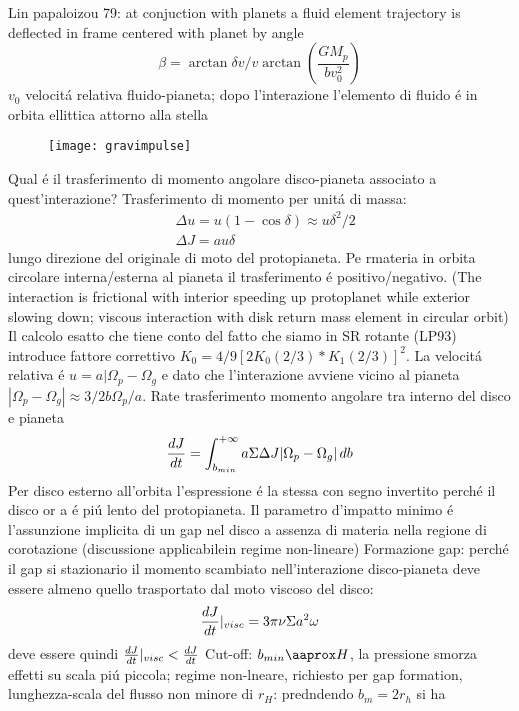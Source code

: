 \begin{workout}
Lin papaloizou 79: at conjuction with planets a fluid element trajectory is deflected in frame centered with planet by angle
\begin{equation}
\beta=\arctan{\delta v/v}\arctan{(\frac{GM_p}{bv_0^2})}
\end{equation}
$v_0$ velocit\'a relativa fluido-pianeta; dopo l'interazione l'elemento di fluido \'e in orbita ellittica attorno alla stella
\begin{figure}[!t]
\texttt{[image: gravimpulse]}
\end{figure}
Qual \'e il trasferimento di momento angolare disco-pianeta associato a quest'interazione?
Trasferimento di momento per unit\'a di massa:
\begin{align}
&\Delta u=u(1-\cos{\delta})\approx u\delta^2/2\\
&\Delta J=au\delta
\end{align}
lungo direzione del originale di moto del protopianeta.
Pe rmateria in orbita circolare interna/esterna al pianeta il trasferimento \'e positivo/negativo.
(The interaction is frictional with interior speeding up protoplanet while exterior slowing down; viscous interaction with disk return mass element in circular orbit)
Il calcolo esatto che tiene conto del fatto che siamo in SR rotante (LP93) introduce fattore correttivo $K_0=4/9[2K_0(2/3)*K_1(2/3)]^2$.
La velocit\'a relativa \'e $u=a|\Omega_p-\Omega_g$ e dato che l'interazione avviene vicino al pianeta $|\Omega_p-\Omega_g|\approx3/2b\Omega_p/a$.
Rate trasferimento momento angolare tra interno del disco e pianeta
\begin{equation}
\TDy{t}{J}=\int_{b_{min}}^{+\infty}a\Sigma\Delta J|\Omega_p-\Omega_g|\,db
\end{equation}
Per disco esterno all'orbita l'espressione \'e la stessa con segno invertito perch\'e il disco or a \'e pi\'u lento del protopianeta.
Il parametro d'impatto minimo \'e l'assunzione implicita di un gap nel disco a assenza di materia nella regione di corotazione (discussione applicabilein regime non-lineare)
Formazione gap: perch\'e il gap si stazionario il momento scambiato nell'interazione disco-pianeta deve essere almeno quello trasportato dal moto viscoso del disco:
\begin{equation}
\TDy{t}{J}|_{visc}=3\pi\nu\Sigma a^2\omega
\end{equation}
deve essere quindi $\TDy{t}{J}|_{visc}<\TDy{t}{J}$
Cut-off: $b_{min}\aaprox H$, la pressione smorza effetti su scala pi\'u piccola; regime non-lneare, richiesto per gap formation, lunghezza-scala del flusso non minore di $r_H$: predndendo $b_m=2r_h$ si ha

\end{workout}
